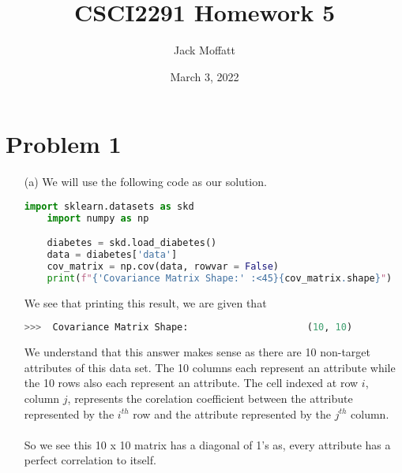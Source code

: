 \documentclass[12pt, letterpaper]{article}
\title{CSCI2291 Homework 5}
\author{Jack Moffatt}
\date{March 3, 2022}
\begin{document}
\maketitle
\noindent\makebox[\linewidth]{\rule{18cm}{0.4pt}}

\section*{Problem 1}
\begin{enumerate}
    \item [(a)] We will use the following code as our solution.
\begin{lstlisting}[language = python]
    import sklearn.datasets as skd
    import numpy as np

    diabetes = skd.load_diabetes()
    data = diabetes['data']
    cov_matrix = np.cov(data, rowvar = False)
    print(f"{'Covariance Matrix Shape:' :<45}{cov_matrix.shape}")
\end{lstlisting}
    We see that printing this result, we are given that 
\begin{lstlisting}[language = python]
    >>>  Covariance Matrix Shape:                     (10, 10)
\end{lstlisting}
    We understand that this answer makes sense as there are 10 non-target attributes of this data set.
    The 10 columns each represent an attribute while the 10 rows also each represent an attribute. The cell indexed 
    at row $i$, column $j$, represents the corelation coefficient between the attribute represented by the $i^{th}$ row 
    and the attribute represented by the $j^{th}$ column. \\ \\
    So we see this 10 x 10 matrix has a diagonal of 1's as, every attribute has a perfect correlation to itself. 


\end{enumerate}
\end{document}

